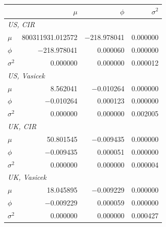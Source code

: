 \begin{tabular}{lrrr}
\toprule
 & $\mu$ & $\phi$ & $\sigma^2$ \\
\midrule
\multicolumn{4}{l}{\textit{US, CIR}} \\
$\mu$ & 800311931.012572 & \ensuremath{-}218.978041 & 0.000000 \\
$\phi$ & \ensuremath{-}218.978041 & 0.000060 & 0.000000 \\
$\sigma^2$ & 0.000000 & 0.000000 & 0.000012 \\
\midrule
\multicolumn{4}{l}{\textit{US, Vasicek}} \\
$\mu$ & 8.562041 & \ensuremath{-}0.010264 & 0.000000 \\
$\phi$ & \ensuremath{-}0.010264 & 0.000123 & 0.000000 \\
$\sigma^2$ & 0.000000 & 0.000000 & 0.002005 \\
\midrule
\multicolumn{4}{l}{\textit{UK, CIR}} \\
$\mu$ & 50.801545 & \ensuremath{-}0.009435 & 0.000000 \\
$\phi$ & \ensuremath{-}0.009435 & 0.000051 & 0.000000 \\
$\sigma^2$ & 0.000000 & 0.000000 & 0.000004 \\
\midrule
\multicolumn{4}{l}{\textit{UK, Vasicek}} \\
$\mu$ & 18.045895 & \ensuremath{-}0.009229 & 0.000000 \\
$\phi$ & \ensuremath{-}0.009229 & 0.000059 & 0.000000 \\
$\sigma^2$ & 0.000000 & 0.000000 & 0.000427 \\
\bottomrule
\end{tabular}
